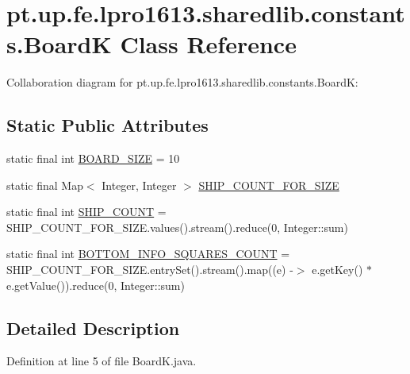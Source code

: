 \hypertarget{classpt_1_1up_1_1fe_1_1lpro1613_1_1sharedlib_1_1constants_1_1_board_k}{}\section{pt.\+up.\+fe.\+lpro1613.\+sharedlib.\+constants.\+BoardK Class Reference}
\label{classpt_1_1up_1_1fe_1_1lpro1613_1_1sharedlib_1_1constants_1_1_board_k}


Collaboration diagram for pt.\+up.\+fe.\+lpro1613.\+sharedlib.\+constants.\+BoardK\+:
\subsection*{Static Public Attributes}
\begin{DoxyCompactItemize}
\item 
static final int \hyperlink{classpt_1_1up_1_1fe_1_1lpro1613_1_1sharedlib_1_1constants_1_1_board_k_a5923011fc0f980adb643b4b972168c15}{B\+O\+A\+R\+D\+\_\+\+S\+I\+ZE} = 10
\item 
static final Map$<$ Integer, Integer $>$ \hyperlink{classpt_1_1up_1_1fe_1_1lpro1613_1_1sharedlib_1_1constants_1_1_board_k_af6ff24deb48459109356bdad0fca5e3b}{S\+H\+I\+P\+\_\+\+C\+O\+U\+N\+T\+\_\+\+F\+O\+R\+\_\+\+S\+I\+ZE}
\item 
static final int \hyperlink{classpt_1_1up_1_1fe_1_1lpro1613_1_1sharedlib_1_1constants_1_1_board_k_ae2fc4102eec84d733b9ca1136687284a}{S\+H\+I\+P\+\_\+\+C\+O\+U\+NT} = S\+H\+I\+P\+\_\+\+C\+O\+U\+N\+T\+\_\+\+F\+O\+R\+\_\+\+S\+I\+Z\+E.\+values().stream().reduce(0, Integer\+::sum)
\item 
static final int \hyperlink{classpt_1_1up_1_1fe_1_1lpro1613_1_1sharedlib_1_1constants_1_1_board_k_a7a93a877fdf11be9f98b8829fce752ca}{B\+O\+T\+T\+O\+M\+\_\+\+I\+N\+F\+O\+\_\+\+S\+Q\+U\+A\+R\+E\+S\+\_\+\+C\+O\+U\+NT} = S\+H\+I\+P\+\_\+\+C\+O\+U\+N\+T\+\_\+\+F\+O\+R\+\_\+\+S\+I\+Z\+E.\+entry\+Set().stream().map((e) -\/$>$ e.\+get\+Key() $\ast$ e.\+get\+Value()).reduce(0, Integer\+::sum)
\end{DoxyCompactItemize}


\subsection{Detailed Description}


Definition at line 5 of file Board\+K.\+java.



